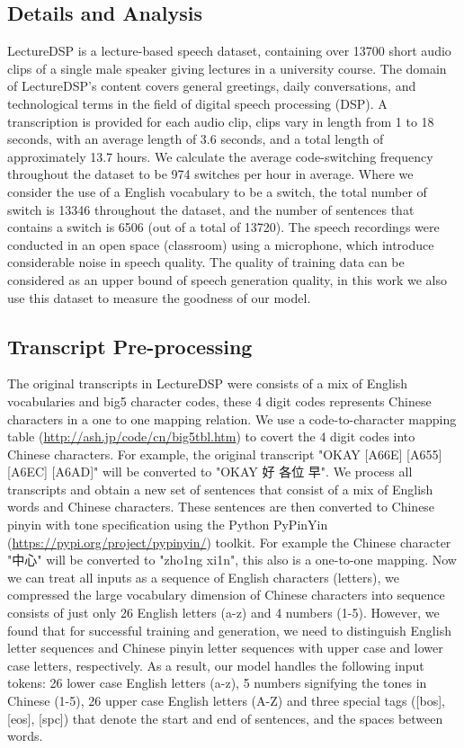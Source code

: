\documentclass{article} %
\begin{document}
\begin{CJK}{UTF8}{bsmi}
\subsection{Details and Analysis}
LectureDSP is a lecture-based speech dataset, containing over 13700 short audio clips of a single  male speaker giving lectures in a university course. The domain of LectureDSP's content covers general greetings, daily conversations, and technological terms in the field of digital speech processing (DSP). A transcription is provided for each audio clip, clips vary in length from 1 to 18 seconds, with an average length of 3.6 seconds, and a total length of approximately 13.7 hours. We calculate the average code-switching frequency throughout the dataset to be 974 switches per hour in average. Where we consider the use of a English vocabulary to be a switch, the total number of switch is 13346 throughout the dataset, and the number of sentences that contains a switch is 6506 (out of a total of 13720). The speech recordings were conducted in an open space (classroom) using a microphone, which introduce considerable noise in speech quality. The quality of training data can be considered as an upper bound of speech generation quality, in this work we also use this dataset to measure the goodness of our model.

\subsection{Transcript Pre-processing}
The original transcripts in LectureDSP were consists of a mix of English vocabularies and big5 character codes, these 4 digit codes represents Chinese characters in a one to one mapping relation. We use a code-to-character mapping table (\url{http://ash.jp/code/cn/big5tbl.htm}) to covert the 4 digit codes into Chinese characters. For example, the original transcript "OKAY [A66E] [A655][A6EC] [A6AD]" will be converted to "OKAY 好 各位 早". We process all transcripts and obtain a new set of sentences that consist of a mix of English words and Chinese characters. These sentences are then converted to Chinese pinyin with tone specification using the Python PyPinYin (\url{https://pypi.org/project/pypinyin/}) toolkit. For example the Chinese character "中心" will be converted to "zho1ng xi1n", this also is a one-to-one mapping. Now we can treat all inputs as a sequence of English characters (letters), we compressed the large vocabulary dimension of Chinese characters into sequence consists of just only 26 English letters (a-z) and 4 numbers (1-5). However, we found that for successful training and generation, we need to distinguish English letter sequences and Chinese pinyin letter sequences with upper case and lower case letters, respectively. As a result, our model handles the following input tokens: 26 lower case English letters (a-z), 5 numbers signifying the tones in Chinese (1-5), 26 upper case English letters (A-Z) and three special tags ([bos], [eos], [spc]) that denote the start and end of sentences, and the spaces between words.


\end{CJK}
\end{document}
